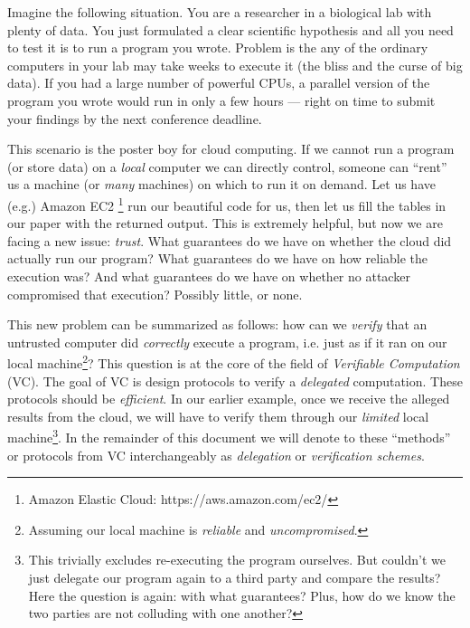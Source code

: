 
Imagine the following situation.
You are a researcher in a biological lab with plenty of data. You just formulated a clear scientific hypothesis and all you need to test it is to run a program you wrote. Problem is the any of the ordinary computers in your lab may take weeks to execute it (the bliss and the curse of big data). If you had a large number of powerful CPUs, a parallel version of the program you wrote would run in only a few hours --- right on time to submit your findings by the next conference deadline.

This scenario is the poster boy for cloud computing. If we cannot run a program (or store data) on a \textit{local} computer we can directly control, someone can ``rent'' us a machine (or \textit{many} machines) on which to run it on demand. Let us have (e.g.) Amazon EC2 \footnote{Amazon Elastic Cloud: https://aws.amazon.com/ec2/} run our beautiful code for us, then let us fill the tables in our paper with the returned output. This is extremely helpful, but now we are facing a new issue: \textit{trust}. 
What guarantees do we have on whether the cloud did actually run our program? What guarantees do we have on how reliable the execution was? And what guarantees do we have on whether no attacker compromised that execution? Possibly little, or none.

This new problem can be summarized as follows: how can we \textit{verify} that an untrusted computer did \textit{correctly} execute a program, i.e. just as if it ran on our local machine\footnote{Assuming our local machine is \textit{reliable} and \textit{uncompromised}.}? 
This question is at the core of the field of \textit{Verifiable Computation} (VC). The goal of VC is design protocols to verify a \textit{delegated} computation. These protocols should be \textit{efficient}. In our earlier example, once we receive the alleged results from the cloud, we will have to verify them through our \textit{limited} local machine\footnote{This trivially excludes re-executing the program ourselves. But couldn't we just delegate our program again to a third party and compare the results? Here the question is again: with what guarantees? Plus, how do we know the two parties are not colluding with one another?}. In the remainder of this document we will denote to these ``methods'' or protocols from VC interchangeably as \textit{delegation} or \textit{verification schemes}.

